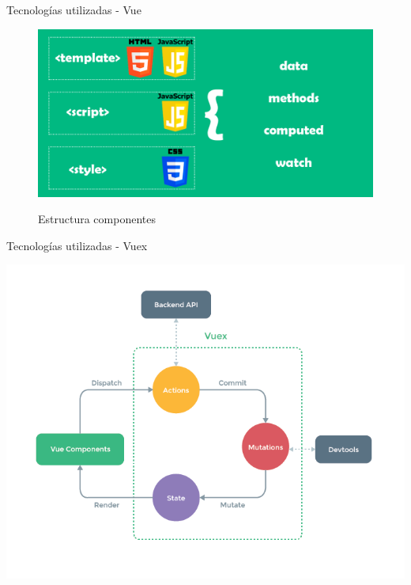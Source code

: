\documentclass{beamer}
\begin{document}
        \begin{frame}{Tecnologías utilizadas - Vue}
        
    		\begin{figure}[htp]
                \centering
                \includegraphics[width=1\textwidth]{Presentacion/tecnologias/sfc.png}\hfill
                \label{fig:sfc}
                \caption{Estructura componentes}
    		\end{figure}  
            
        \end{frame}

        \begin{frame}{Tecnologías utilizadas - Vuex}
        
    		\begin{center}
                \includegraphics[width=.8\textwidth]{Presentacion/tecnologias/vuex.png}\hfill
    		\end{center}  
            
        \end{frame}
\end{document}
